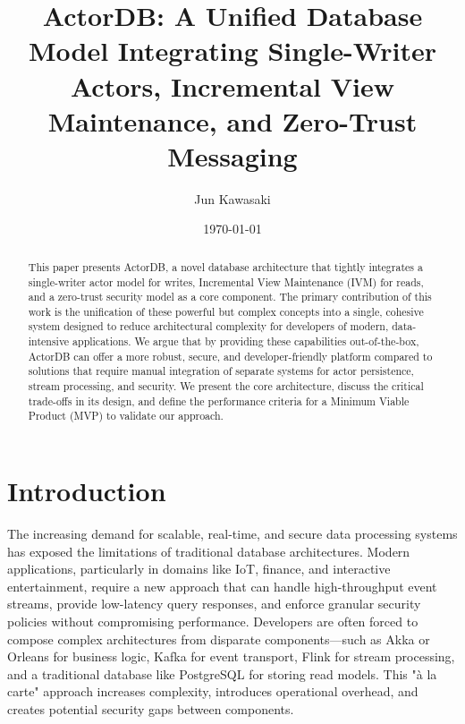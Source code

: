 \documentclass{article}
\title{ActorDB: A Unified Database Model Integrating Single-Writer Actors, Incremental View Maintenance, and Zero-Trust Messaging}
\author{Jun Kawasaki}
\date{\today}
\begin{document}
\maketitle

\begin{abstract}
This paper presents ActorDB, a novel database architecture that tightly integrates a single-writer actor model for writes, Incremental View Maintenance (IVM) for reads, and a zero-trust security model as a core component. The primary contribution of this work is the unification of these powerful but complex concepts into a single, cohesive system designed to reduce architectural complexity for developers of modern, data-intensive applications. We argue that by providing these capabilities out-of-the-box, ActorDB can offer a more robust, secure, and developer-friendly platform compared to solutions that require manual integration of separate systems for actor persistence, stream processing, and security. We present the core architecture, discuss the critical trade-offs in its design, and define the performance criteria for a Minimum Viable Product (MVP) to validate our approach.
\end{abstract}

\section{Introduction}

The increasing demand for scalable, real-time, and secure data processing systems has exposed the limitations of traditional database architectures. Modern applications, particularly in domains like IoT, finance, and interactive entertainment, require a new approach that can handle high-throughput event streams, provide low-latency query responses, and enforce granular security policies without compromising performance. Developers are often forced to compose complex architectures from disparate components—such as Akka or Orleans for business logic, Kafka for event transport, Flink for stream processing, and a traditional database like PostgreSQL for storing read models. This "à la carte" approach increases complexity, introduces operational overhead, and creates potential security gaps between components.
\end{document}
